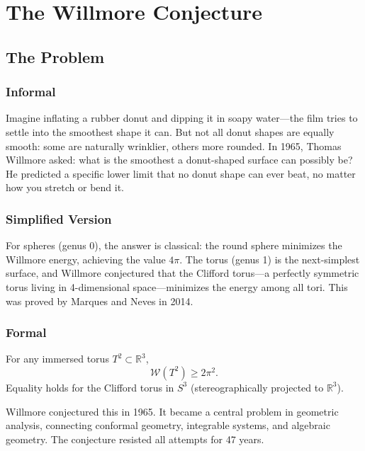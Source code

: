 \let\LocalMacro\relax

\chapter{The Willmore Conjecture}

\section{The Problem}

\subsection{Informal}
Imagine inflating a rubber donut and dipping it in soapy water---the film tries to settle into the smoothest shape it can. But not all donut shapes are equally smooth: some are naturally wrinklier, others more rounded. In 1965, Thomas Willmore asked: what is the smoothest a donut-shaped surface can possibly be? He predicted a specific lower limit that no donut shape can ever beat, no matter how you stretch or bend it.

\subsection{Simplified Version}
For spheres (genus 0), the answer is classical: the round sphere minimizes the Willmore energy, achieving the value $4\pi$. The torus (genus 1) is the next-simplest surface, and Willmore conjectured that the Clifford torus---a perfectly symmetric torus living in 4-dimensional space---minimizes the energy among all tori. This was proved by Marques and Neves in 2014.

\subsection{Formal}
\begin{conjecture}[Willmore, 1965]
For any immersed torus $T^2 \subset \mathbb{R}^3$,
\[
\mathcal{W}(T^2) \ge 2\pi^2.
\]
Equality holds for the Clifford torus in $S^3$ (stereographically projected to $\mathbb{R}^3$).
\end{conjecture}

\begin{historicalbox}
Willmore conjectured this in 1965. It became a central problem in geometric analysis, connecting conformal geometry, integrable systems, and algebraic geometry. The conjecture resisted all attempts for 47 years.
\end{historicalbox}

